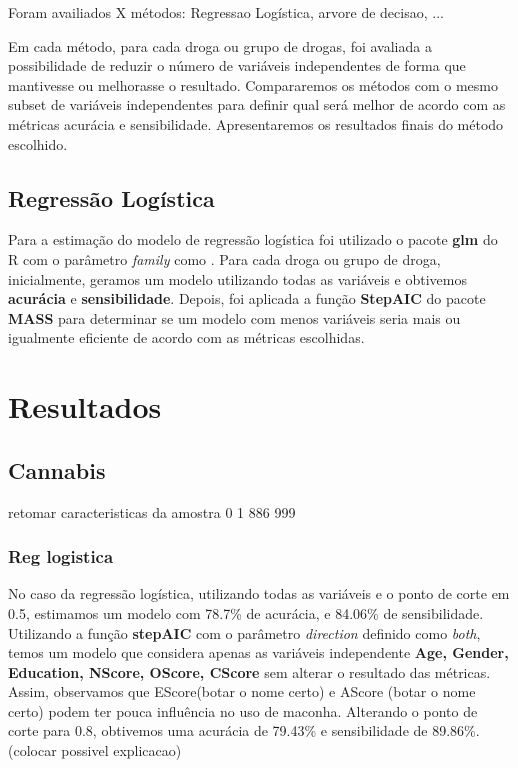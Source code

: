 \documentclass[
	article,			%
	11pt,				%
	oneside,			%
	a4paper,			%
	english,			%
	brazil,				%
	sumario=tradicional
	]{abntex2}
\begin{document}
Foram availiados X métodos: Regressao Logística, arvore de decisao, ... 

Em cada método, para cada droga ou grupo de drogas, foi avaliada a possibilidade de reduzir o número de variáveis independentes de forma que mantivesse ou melhorasse o resultado. Compararemos os métodos com o mesmo subset de variáveis independentes para definir qual será melhor de acordo com as métricas acurácia e sensibilidade. Apresentaremos os resultados finais do método escolhido. 

\subsection{Regressão Logística}

Para a estimação do modelo de regressão logística foi utilizado o pacote \textbf{glm} do R com o parâmetro \emph{family} como .
Para cada droga ou grupo de droga, inicialmente, geramos um modelo utilizando todas as variáveis e obtivemos \textbf{acurácia} e \textbf{sensibilidade}. Depois, foi aplicada a função \textbf{StepAIC} do pacote \textbf{MASS} para determinar se um modelo com menos variáveis seria mais ou igualmente eficiente de acordo com as métricas escolhidas.



\section{Resultados}

\subsection{Cannabis}

retomar caracteristicas da amostra
 0   1 
886 999 

\subsubsection{Reg logistica}

No caso da regressão logística, utilizando todas as variáveis e o ponto de corte em 0.5, estimamos um modelo com 78.7\% de acurácia, e 84.06\% de sensibilidade. 
Utilizando a função \textbf{stepAIC} com o parâmetro \emph{direction} definido como \emph{both}, temos um modelo que considera apenas as variáveis independente \textbf{Age, Gender, Education, NScore, OScore, CScore} sem alterar o resultado das métricas. Assim, observamos que EScore(botar o nome certo) e AScore (botar o nome certo) podem ter pouca influência no uso de maconha.
Alterando o ponto de corte para 0.8, obtivemos uma acurácia de 79.43\% e sensibilidade de 89.86\%. (colocar possivel explicacao)
\end{document}
